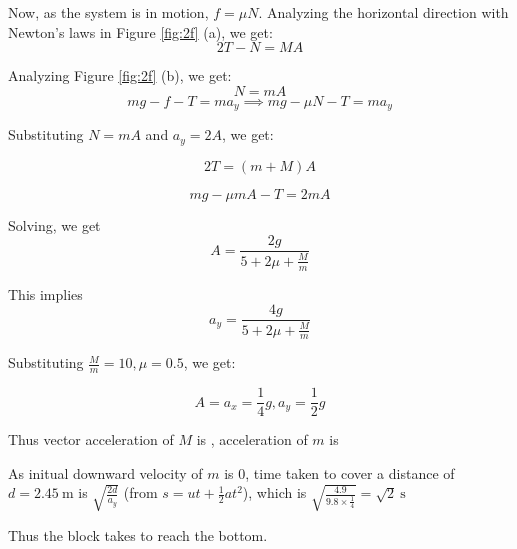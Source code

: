 \documentclass[12pt]{article}
\begin{document}
Now, as the system is in motion, $f=\mu N$. Analyzing the horizontal direction with Newton's laws in Figure \ref{fig:2f} (a), we get: $$2T-N=MA$$

Analyzing Figure \ref{fig:2f} (b), we get: $$N=mA$$ $$mg-f-T=ma_y\implies mg-\mu N -T =ma_y$$


Substituting $N=mA$ and $a_y=2A$, we get:

$$2T=(m+M)A$$

$$mg-\mu mA -T=2mA$$

Solving, we get $$A=\frac{2g}{5+2\mu+\frac Mm}$$

This implies  $$a_y=\frac{4g}{5+2\mu+\frac Mm}$$

Substituting $\frac Mm=10, \mu=0.5$, we get:

$$A=a_x=\frac14 g, a_y=\frac12 g$$

Thus vector acceleration of $M$ is , acceleration of $m$ is 

As initual downward velocity of $m$ is 0, time taken to cover a distance of $d=2.45 ~\mathrm m$ is $\sqrt{\frac{2d}{a_y}}$ (from $s=ut+\frac12 at^2$), which is $\sqrt{\frac{4.9}{9.8\times \frac{1}{4}}} = \sqrt{2}~\mathrm s$

Thus the block takes  to reach the bottom.
\newpage
\end{document}
